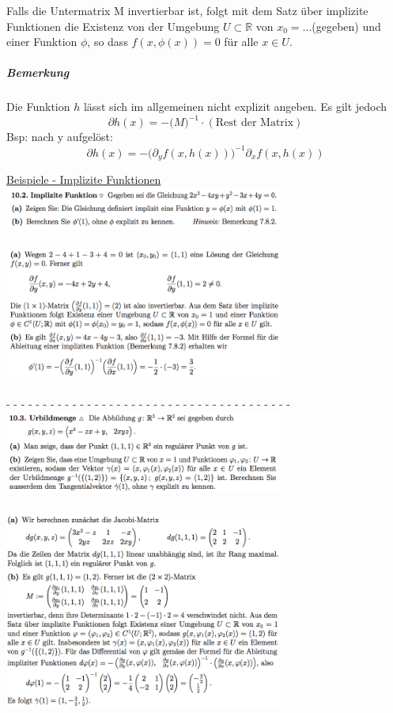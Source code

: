 \documentclass[6pt]{article}
\newcommand{\R}{\mathbb{R}}
\begin{document}
\begin{multicols*}{3}
		Falls die Untermatrix M invertierbar ist, folgt mit dem Satz {\"u}ber implizite Funktionen die Existenz von der Umgebung $U \subset \R$ von $x_0=... $(gegeben) und einer Funktion $\phi$, so dass $f(x, \phi(x))=0$ f{\"u}r alle $x \in U$.
		
		
			\subparagraph{Bemerkung} Die Funktion $h$ l{\"a}sst sich im allgemeinen nicht explizit angeben. Es gilt jedoch
	\[ \partial h(x) = - \big( M \big)^{-1} \cdot (\text{Rest der Matrix}) \]
	Bsp: nach y aufgel{\"o}st:
	\[ \partial h(x) = - \big( \partial_y f(x,h(x))\big)^{-1} \partial_x f(x,h(x)) \]	

		\vspace{50mm}
		\quad
		
		
		\columnbreak
		\underline{Beispiele - Implizite Funktionen} \vspace{1mm} \\
				\includegraphics[width=260pt]{images/ImpliziteFunktionen01} \\
				\quad \\
				\includegraphics[width=260pt]{images/ImpliziteFunktionen00}
				
			- - - - - - - - - - - - - - - - - - - - - - - - - - - - - - - - - - - - - - -  \\
				
				\includegraphics[width=260pt]{images/ImpliziteFunktionen1} \\
				\quad \\
				\includegraphics[width=260pt]{images/ImpliziteFunktionen2}
		

\end{multicols*}
\end{document}
